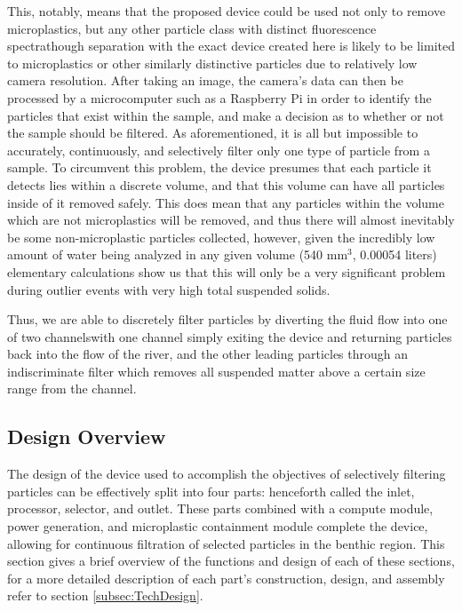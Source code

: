 \documentclass[fleqn,10pt]{SelfArx} %
\begin{document}
	This, notably, means that the proposed device could be used not only to remove microplastics, but any other particle class with distinct fluorescence spectra\textemdash though separation with the exact device created here is likely to be limited to microplastics or other similarly distinctive particles due to relatively low camera resolution. After taking an image, the camera’s data can then be processed by a microcomputer such as a Raspberry Pi in order to identify the particles that exist within the sample, and make a decision as to whether or not the sample should be filtered. As aforementioned, it is all but impossible to accurately, continuously, and selectively filter only one type of particle from a sample. To circumvent this problem, the device presumes that each particle it detects lies within a discrete volume, and that this volume can have all particles inside of it removed safely. This does mean that any particles within the volume which are not microplastics will be removed, and thus there will almost inevitably be some non-microplastic particles collected, however, given the incredibly low amount of water being analyzed in any given volume (540 mm$^{3}$, 0.00054 liters) elementary calculations show us that this will only be a very significant problem during outlier events with very high total suspended solids. \linebreak
	
	Thus, we are able to discretely filter particles by diverting the fluid flow into one of two channels\textemdash with one channel simply exiting the device and returning particles back into the flow of the river, and the other leading particles through an indiscriminate filter which removes all suspended matter above a certain size range from the channel. 
	
	\subsection{Design Overview}
	The design of the device used to accomplish the objectives of selectively filtering particles can be effectively split into four parts: henceforth called the inlet, processor, selector, and outlet. These parts combined with a compute module, power generation, and microplastic containment module complete the device, allowing for continuous filtration of selected particles in the \gls{benthic} region. This section gives a brief overview of the functions and design of each of these sections, for a more detailed description of each part’s construction, design, and assembly refer to  section \ref{subsec:TechDesign}.
	
\end{document}

